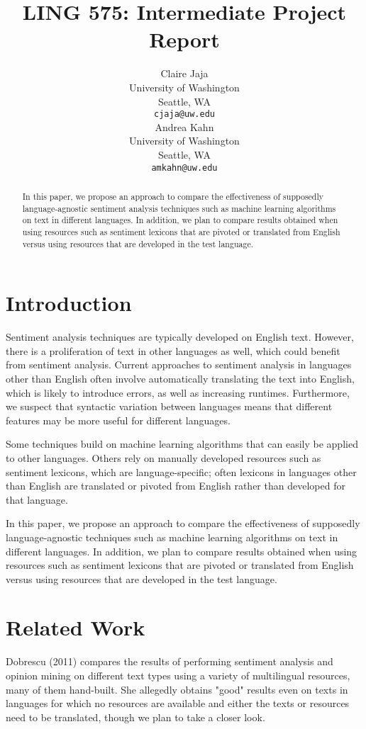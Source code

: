 \documentclass[11pt]{article}
\title{LING 575: Intermediate Project Report}
\author{Claire Jaja \\
  University of Washington \\
  Seattle, WA \\
  {\tt cjaja@uw.edu} \\\And
  Andrea Kahn \\
  University of Washington \\
  Seattle, WA \\
  {\tt amkahn@uw.edu} \\}
\date{}
\begin{document}
\maketitle
\begin{abstract}
In this paper, we propose an approach to compare the effectiveness of supposedly language-agnostic sentiment analysis techniques such as machine learning algorithms on text in different languages. In addition, we plan to compare results obtained when using resources such as sentiment lexicons that are pivoted or translated from English versus using resources that are developed in the test language.
\end{abstract}

\section{Introduction}

Sentiment analysis techniques are typically developed on English text.  However, there is a proliferation of text in other languages as well, which could benefit from sentiment analysis.  Current approaches to sentiment analysis in languages other than English often involve automatically translating the text into English, which is likely to introduce errors, as well as increasing runtimes.  Furthermore, we suspect that syntactic variation between languages means that different features may be more useful for different languages.

Some techniques build on machine learning algorithms that can easily be applied to other languages.  Others rely on manually developed resources such as sentiment lexicons, which are language-specific; often lexicons in languages other than English are translated or pivoted from English rather than developed for that language.

In this paper, we propose an approach to compare the effectiveness of supposedly language-agnostic techniques such as machine learning algorithms on text in different languages. In addition, we plan to compare results obtained when using resources such as sentiment lexicons that are pivoted or translated from English versus using resources that are developed in the test language.

\section{Related Work}

Dobrescu (2011) compares the results of performing sentiment analysis and opinion mining on different text types using a variety of multilingual resources, many of them hand-built. She allegedly obtains "good" results even on texts in languages for which no resources are available and either the texts or resources need to be translated, though we plan to take a closer look.
\end{document}
